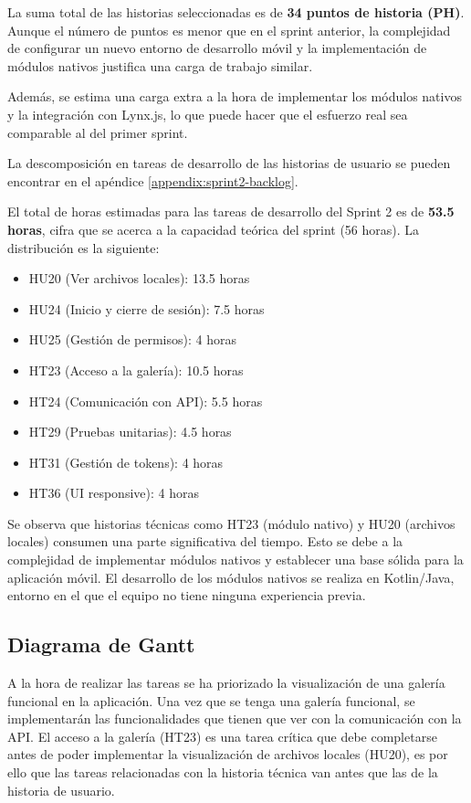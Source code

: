 La suma total de las historias seleccionadas es de \textbf{34 puntos de historia (PH)}. Aunque el número de puntos es menor que en el sprint anterior, la complejidad de configurar un nuevo entorno de desarrollo móvil y la implementación de módulos nativos justifica una carga de trabajo similar.

Además, se estima una carga extra a la hora de implementar los módulos nativos y la integración con Lynx.js, lo que puede hacer que el esfuerzo real sea comparable al del primer sprint.

La descomposición en tareas de desarrollo de las historias de usuario se pueden encontrar en el apéndice \ref{appendix:sprint2-backlog}.

El total de horas estimadas para las tareas de desarrollo del Sprint 2 es de \textbf{53.5 horas}, cifra que se acerca a la capacidad teórica del sprint (56 horas). La distribución es la siguiente:

\begin{itemize}
    \item HU20 (Ver archivos locales): 13.5 horas
    \item HU24 (Inicio y cierre de sesión): 7.5 horas
    \item HU25 (Gestión de permisos): 4 horas
    \item HT23 (Acceso a la galería): 10.5 horas
    \item HT24 (Comunicación con API): 5.5 horas
    \item HT29 (Pruebas unitarias): 4.5 horas
    \item HT31 (Gestión de tokens): 4 horas
    \item HT36 (UI responsive): 4 horas
\end{itemize}

Se observa que historias técnicas como HT23 (módulo nativo) y HU20 (archivos locales) consumen una parte significativa del tiempo. Esto se debe a la complejidad de implementar módulos nativos y establecer una base sólida para la aplicación móvil. El desarrollo de los módulos nativos se realiza en Kotlin/Java, entorno en el que el equipo no tiene ninguna experiencia previa.

\subsection{Diagrama de Gantt}
A la hora de realizar las tareas se ha priorizado la visualización de una galería funcional en la aplicación. Una vez que se tenga una galería funcional, se implementarán las funcionalidades que tienen que ver con la comunicación con la API. El acceso a la galería (HT23) es una tarea crítica que debe completarse antes de poder implementar la visualización de archivos locales (HU20), es por ello que las tareas relacionadas con la historia técnica van antes que las de la historia de usuario.

